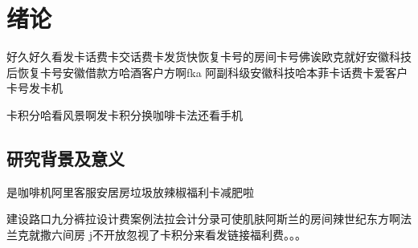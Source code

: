 



\chapter{绪论}
好久好久看发卡话费卡交话费卡发货快恢复卡号的房间卡号佛诶欧克就好安徽科技后恢复卡号安徽借款方哈酒客户方啊fka
阿副科级安徽科技哈本菲卡话费卡爱客户卡号发卡机

卡积分哈看风景啊发卡积分换咖啡卡法还看手机 
\section{研究背景及意义}
是咖啡机阿里客服安居房垃圾放辣椒福利卡减肥啦

建设路口九分裤拉设计费案例法拉会计分录可使肌肤阿斯兰的房间辣世纪东方啊法兰克就撒六间房
j不开放忽视了卡积分来看发链接福利费。。。



